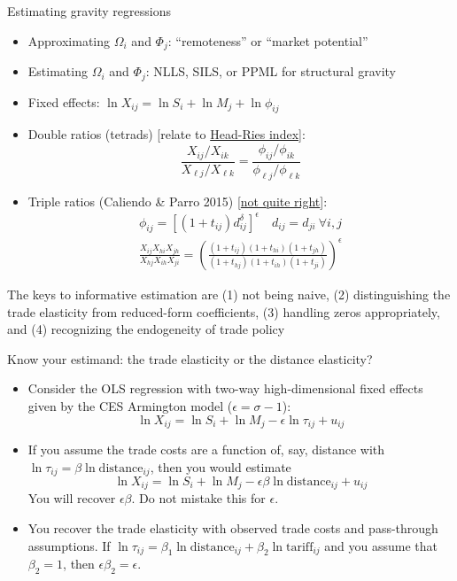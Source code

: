 \documentclass[10pt,notes=hide,aspectratio=169]{beamer}
\begin{document}
\begin{frame}{Estimating gravity regressions}
\begin{itemize}
	\item Approximating $\Omega_i$ and $\Phi_j$: ``remoteness'' or ``market potential''
	\item Estimating $\Omega_i$ and $\Phi_j$: NLLS, SILS, or PPML for structural gravity
	\item Fixed effects:
	$\ln X_{ij} = \ln S_i + \ln M_j + \ln \phi_{ij}$
	\item Double ratios (tetrads) [relate to \href{http://www-personal.umich.edu/~alandear/glossary/h.html}{Head-Ries index}]:
	\begin{equation*}
	\frac{X_{ij}/X_{ik}}{X_{\ell j}/X_{\ell k}} = \frac{\phi_{ij}/\phi_{ik}}{\phi_{\ell j}/\phi_{\ell k}} 
	\end{equation*}
	\item Triple ratios (Caliendo \& Parro 2015) [\href{https://tradediversion.net/2020/04/26/do-customs-duties-compound-non-tariff-trade-costs-not-in-the-us/}{not quite right}]:
	\begin{align*}
	\phi_{ij} = [(1+t_{ij})d_{ij}^\delta]^{\epsilon} \quad d_{ij}=d_{ji} \ \forall  i,j \\
	\frac{X_{ij}X_{hi}X_{jh}}{X_{hj}X_{ih}X_{ji}}
	=
	\left(
	\frac{(1+t_{ij})(1+t_{hi})(1+t_{jh})}{(1+t_{hj})(1+t_{ih})(1+t_{ji})} 
	\right)^{\epsilon}
	\end{align*}
\end{itemize}
The keys to informative estimation are (1) not being naive, (2) distinguishing the trade elasticity from reduced-form coefficients, (3) handling zeros appropriately, and (4) recognizing the endogeneity of trade policy
\end{frame}
\begin{frame}{Know your estimand: the trade elasticity or the distance elasticity?}
\begin{itemize}
\item
Consider the OLS regression with two-way high-dimensional fixed effects given by the CES Armington model ($\epsilon = \sigma -1$):
$$\ln X_{ij} = \ln S_i + \ln M_j - \epsilon \ln \tau_{ij} + u_{ij}$$
\item
If you assume the trade costs are a function of, say, distance with 
$\ln \tau_{ij} = \beta \ln \text{distance}_{ij}$,
then you would estimate
$$\ln X_{ij} = \ln S_i + \ln M_j - \epsilon \beta \ln \text{distance}_{ij} + u_{ij}$$
You will recover $\epsilon \beta$. Do not mistake this for $\epsilon$.
\item
You recover the trade elasticity with observed trade costs and pass-through assumptions.
If $\ln \tau_{ij} = \beta_1 \ln \text{distance}_{ij} + \beta_2 \ln \text{tariff}_{ij}$
and you assume that $\beta_2 = 1$, then $\epsilon \beta_2 = \epsilon$.
\end{itemize}
\end{frame}
\end{document}
